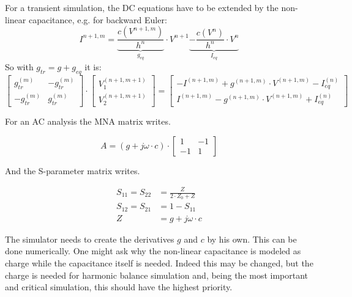 For a transient simulation, the DC equations have to be extended
by the non-linear capacitance, e.g. for backward Euler:
\begin{equation}
I^{n+1,m} = \underbrace{\dfrac{c(V^{n+1,m})}{h^n}}_{g_{eq}}\cdot V^{n+1}
            \underbrace{- \dfrac{c(V^{n})}{h^n}\cdot V^{n}}_{I_{eq}}
\end{equation}
So with $g_{tr} = g + g_{eq}$ it is:
\begin{equation}
\begin{bmatrix}
 g_{tr}^{(m)} & -g_{tr}^{(m)}\\
-g_{tr}^{(m)} &  g_{tr}^{(m)}
\end{bmatrix}
\cdot
\begin{bmatrix}
V_{1}^{(n+1,m+1)}\\
V_{2}^{(n+1,m+1)}
\end{bmatrix}
=
\begin{bmatrix}
-I^{(n+1,m)} + g^{(n+1,m)}\cdot V^{(n+1,m)} - I_{eq}^{(n)}\\
 I^{(n+1,m)} - g^{(n+1,m)}\cdot V^{(n+1,m)} + I_{eq}^{(n)}
\end{bmatrix}
\end{equation}

For an AC analysis the MNA matrix writes.

\begin{equation}
A = (g + j\omega\cdot c)\cdot
\begin{bmatrix}
 1 & -1\\
-1 &  1
\end{bmatrix}
\end{equation}

And the S-parameter matrix writes.

\begin{align}
S_{11} = S_{22} &= \frac{Z}{2\cdot Z_0+Z} \\
S_{12} = S_{21} &= 1-S_{11} \\
Z &= g + j\omega\cdot c
\end{align}

The simulator needs to create the derivatives $g$ and $c$ by his
own. This can be done numerically. One might ask why the non-linear
capacitance is modeled as charge while the capacitance itself is
needed. Indeed this may be changed, but the charge is needed for
harmonic balance simulation and, being the most important and critical
simulation, this should have the highest priority.

\addvspace{12pt}

